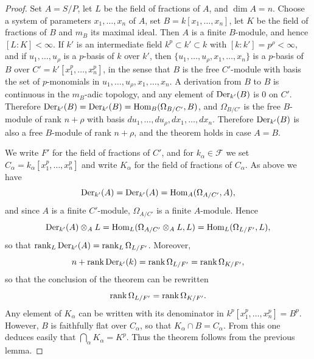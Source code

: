 \begin{proof}
Set $A = S/P$, let $L$ be the field of fractions of $A$, and $\dim A = n$. Choose a
system of parameters $x_1, \ldots, x_n$ of $A$, set $B = k[x_1, \ldots, x_n]$, let $K$ be the
field of fractions of $B$ and $m_B$ its maximal ideal. Then $A$ is a finite $B$-module,
and hence $[L : K] < \infty$. If $k'$ is an intermediate field $k^p \subset k' \subset k$
with $[k : k'] = p^\rho < \infty$, and if $u_1, \ldots, u_\rho$ is a $p$-basis of $k$ over $k'$,
then $\{u_1, \ldots, u_\rho, x_1, \ldots, x_n\}$ is a $p$-basis of $B$ over
$C' = k'[x_1^p, \ldots, x_n^p]$, in the sense that $B$ is the free $C'$-module with basis
the set of $p$-monomials in $u_1, \ldots, u_\rho, x_1, \ldots, x_n$. A derivation from $B$ to
$B$ is continuous in the $m_B$-adic topology, and any element of $\operatorname{Der}_{k'}(B)$ is $0$ on
$C'$. Therefore $\operatorname{Der}_{k'}(B) = \operatorname{Der}_{k'}(B) = \operatorname{Hom}_B(\Omega_{B/C'}, B)$, and $\Omega_{B/C'}$ is
the free $B$-module of rank $n + \rho$ with basis $du_1, \ldots, du_\rho, dx_1, \ldots, dx_n$.
Therefore $\operatorname{Der}_{k'}(B)$ is also a free $B$-module of rank $n + \rho$, and the theorem
holds in case $A = B$.

We write $F'$ for the field of fractions of $C'$, and for $k_\alpha \in \mathcal{F}$ we set
$C_\alpha = k_\alpha[x_1^p, \ldots, x_n^p]$ and write $K_\alpha$ for the field of fractions of
$C_\alpha$. As above we have
\[
  \operatorname{Der}_{k'}(A) = \operatorname{Der}_{k'}(A) = \operatorname{Hom}_A(\Omega_{A/C'}, A),
\]
and since $A$ is a finite $C'$-module, $\Omega_{A/C'}$ is a finite $A$-module. Hence
\[
  \operatorname{Der}_{k'}(A) \otimes_A L = \operatorname{Hom}_L(\Omega_{A/C'} \otimes_A L, L) = \operatorname{Hom}_L(\Omega_{L/F'}, L),
\]
so that $\operatorname{rank}_L \operatorname{Der}_{k'}(A) = \operatorname{rank}_L \Omega_{L/F'}$. Moreover,
\[
  n + \operatorname{rank} \operatorname{Der}_{k'}(k) = \operatorname{rank} \Omega_{L/F'} = \operatorname{rank} \Omega_{K/F'},
\]
so that the conclusion of the theorem can be rewritten
\[
  \operatorname{rank} \Omega_{L/F'} = \operatorname{rank} \Omega_{K/F'}.
\]
Any element of $K_\alpha$ can be written with its denominator in
$k^p[x_1^p, \ldots, x_n^p] = B^p$. However, $B$ is faithfully flat over $C_\alpha$, so that
$K_\alpha \cap B = C_\alpha$. From this one deduces easily that
$\bigcap_\alpha K_\alpha = K^p$. Thus the theorem follows from the previous lemma.
\end{proof}

